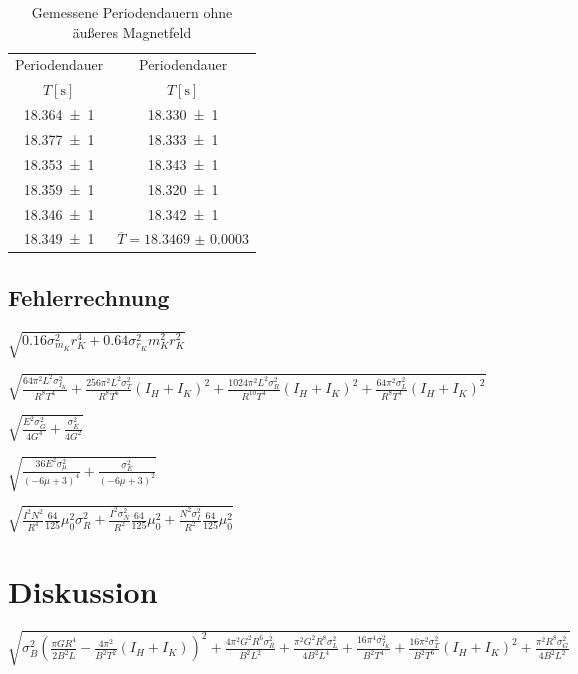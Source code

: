   

    
    
      \begin{table}[h]
        \begin{tabular}{|C||C|}
          \hline
          Periodendauer & Periodendauer \\ 
          $T[\si{\second}]$ & $T[\si{\second}]$\\
          \hline \hline
          \num{18,364(1)} & \num{18,330(1)}\\ 
          \num{18,377(1)} & \num{18,333(1)}\\ 
          \num{18,353(1)} & \num{18,343(1)}\\ 
          \num{18,359(1)} & \num{18,320(1)}\\ 
          \num{18,346(1)} & \num{18,342(1)}\\    
          \num{18,349(1)} & $\overline{T} = \num{18.3469(3)}$ \\ \hline
    
    
        \end{tabular}
        \centering
        \caption{Gemessene Periodendauern ohne äußeres Magnetfeld}
        \label{Tab1}
      \end{table}
      

  \subsection{Fehlerrechnung}
    \label{Fehlerrechnung}
  $\sqrt{0.16 \sigma_{m_{K}}^{2} r_{K}^{4} + 0.64 \sigma_{r_{K}}^{2} m_{K}^{2} r_{K}^{2}}$
  
  $\displaystyle \sqrt{\frac{64 \pi^{2} L^{2} \sigma_{I_{K}}^{2}}{R^{8} T^{4}} + \frac{256 \pi^{2} L^{2} \sigma_{T}^{2}}{R^{8} T^{6}} \left(I_{H} + I_{K}\right)^{2} +
  \frac{1024 \pi^{2} L^{2} \sigma_{R}^{2}}{R^{10} T^{4}} \left(I_{H} + I_{K}\right)^{2} + \frac{64 \pi^{2} \sigma_{L}^{2}}{R^{8} T^{4}} \left(I_{H} + I_{K}\right)^{2}}$
  
  $\displaystyle  \sqrt{\frac{E^{2} \sigma_{G}^{2}}{4 G^{4}} + \frac{\sigma_{E}^{2}}{4 G^{2}}}$
  
  $\displaystyle  \sqrt{\frac{36 E^{2} \sigma_{\mu}^{2}}{\left(- 6 \mu + 3\right)^{4}} + \frac{\sigma_{E}^{2}}{\left(- 6 \mu + 3\right)^{2}}}$
  
  $\displaystyle  \sqrt{\frac{I^{2} N^{2}}{R^{4}} \frac{64}{125}\mu_{0}^{2} \sigma_{R}^{2} + \frac{I^{2} \sigma_{N}^{2}}{R^{2}}\frac{64}{125}\mu_{0}^{2}+ \frac{N^{2} \sigma_{I}^{2}}{R^{2}} \frac{64}{125}\mu_{0}^{2}}$
  \section{Diskussion}
   
  $ \sqrt{\sigma_{B}^{2} \left(\frac{\pi G R^{4}}{2 B^{2} L} - \frac{ 4\pi^{2} }{B^{2} T^{2}} \left(I_{H} + I_{K}\right)\right)^{2} + \frac{4\pi^{2} G^{2} R^{6} \sigma_{R}^{2}}{B^{2} L^{2}} + \frac{\pi^{2} G^{2} R^{8} \sigma_{L}^{2}}{4 B^{2} L^{4}} + \frac{16\pi^{4} \sigma_{I_{K}}^{2}}{B^{2} T^{4}} + \frac{16 \pi^{2} \sigma_{T}^{2}}{B^{2} T^{6}} \left(I_{H} + I_{K}\right)^{2} + \frac{\pi^{2} R^{8} \sigma_{G}^{2}}{4 B^{2} L^{2}}}$



